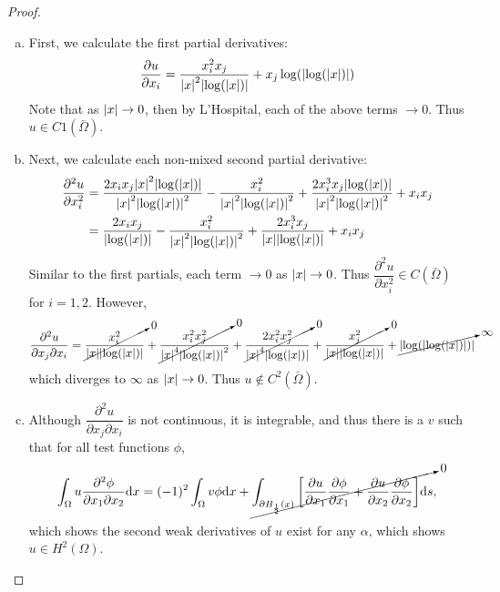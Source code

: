 \documentclass{article} %
\theoremstyle{plain}
\numberwithin{equation}{section} %
\numberwithin{figure}{section} %
\numberwithin{table}{section} %
\begin{document}
\begin{proof}
    \begin{enumerate}[(a)]
        \item First, we calculate the first partial derivatives:
        \begin{align*}
            \frac{\partial u}{\partial x_i} = \frac{x_i^2 x_j}{\abs{x}^2\abs{\log(\abs{x})}} + x_j \log(\abs{\log(\abs{x})})
        \end{align*}
        Note that as $\abs{x} \rightarrow 0$, then by L'Hospital, each of the above terms $\rightarrow 0$.  Thus $u \in C1(\bar{\Omega})$.
        \item Next, we calculate each non-mixed second partial derivative:
        \begin{align*}
            \frac{\partial^2 u}{\partial x_i^2} &= \frac{2x_ix_j\abs{x}^2\abs{\log(\abs{x})}}{\abs{x}^2\abs{\log(\abs{x})}^2} - \frac{x_i^2}{\abs{x}^2\abs{\log(\abs{x})}^2} + \frac{2x_i^3x_j\abs{\log(\abs{x})}}{\abs{x}^2\abs{\log(\abs{x})}^2} + x_ix_j \\
            &= \frac{2x_ix_j}{\abs{\log(\abs{x})}} - \frac{x_i^2}{\abs{x}^2\abs{\log(\abs{x})}^2} + \frac{2x_i^3x_j}{\abs{x}\abs{\log(\abs{x})}} + x_ix_j
        \end{align*}
        Similar to the first partials, each term $\rightarrow 0$ as $\abs{x} \rightarrow 0$.  Thus $\dfrac{\partial^2 u}{\partial x_i^2} \in C(\bar{\Omega})$ for $i = 1, 2$.  However,
        \begin{align*}
            \frac{\partial^2 u}{\partial x_j \partial x_i} &= \cancelto{0}{\frac{x_i^2}{\abs{x}\abs{\log(\abs{x})}}} + \cancelto{0}{\frac{x_i^2x_j^2}{\abs{x}^4\abs{\log(\abs{x})}^2}} + \cancelto{0}{\frac{2x_i^2x_j^2}{\abs{x}^4\abs{\log(\abs{x})}}} + \cancelto{0}{\frac{x_j^2}{\abs{x}\abs{\log(\abs{x})}}} + \cancelto{\infty}{\abs{\log(\abs{\log(\abs{x})})}}
        \end{align*}
        which diverges to $\infty$ as $\abs{x} \rightarrow 0$.  Thus $u \not\in C^2(\bar{\Omega})$.
        \item Although $\dfrac{\partial^2 u}{\partial x_j \partial x_i}$ is not continuous, it is integrable, and thus there is a $v$ such that for all test functions $\phi$,
        \begin{align*}
            \int_{\Omega} u \frac{\partial^2 \phi}{\partial x_1 \partial x_2} \dd x = (-1)^2 \int_\Omega v \phi \dd x + \cancelto{0}{\int_{\partial B_{\frac{1}{2}}(x)}\qty[\frac{\partial u}{\partial x_1} \frac{\partial \phi}{\partial x_1} + \frac{\partial u}{\partial x_2}\frac{\partial \phi}{\partial x_2}] \dd s},
        \end{align*}
        which shows the second weak derivatives of $u$ exist for any $\alpha$, which shows $u \in H^2(\Omega)$.
    \end{enumerate}
\end{proof}
\end{document}
